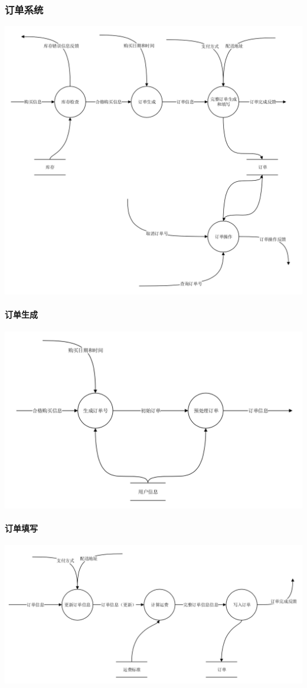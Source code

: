 \subsubsection{订单系统}
\includegraphics{img/3.png}
\paragraph{订单生成}
\includegraphics{img/3.2.png}
\paragraph{订单填写}
\includegraphics{img/3.3.png}

